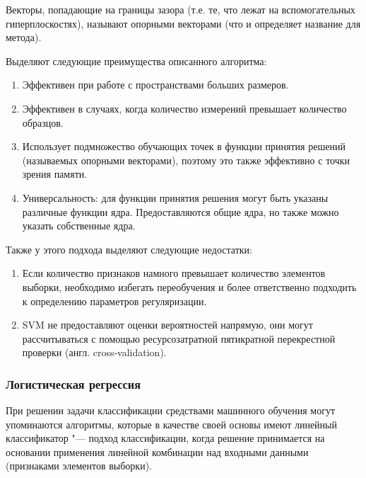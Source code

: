 \documentclass[bachelor, och, coursework]{SCWorks}
\begin{document}
            Векторы, попадающие на границы зазора (т.е. те, что лежат на
            вспомогательных гиперплоскостях), называют опорными векторами (что и
            определяет название для метода).

            Выделяют следующие преимущества описанного алгоритма:

            \begin{enumerate}
                \item Эффективен при работе с пространствами больших размеров.
                \item Эффективен в случаях, когда количество измерений превышает
                количество образцов.
                \item Использует подмножество обучающих точек в функции принятия
                решений (называемых опорными векторами), поэтому это также
                эффективно с точки зрения памяти.
                \item Универсальность: для функции принятия решения могут быть
                указаны различные функции ядра. Предоставляются общие ядра, но
                также можно указать собственные ядра.
            \end{enumerate}
            
            Также у этого подхода выделяют следующие недостатки:

            \begin{enumerate}
                \item Если количество признаков намного превышает количество
                элементов выборки, необходимо избегать переобучения и более
                ответственно подходить к определению параметров регуляризации.
                \item SVM не предоставляют оценки вероятностей напрямую, они
                могут рассчитываться с помощью ресурсозатратной пятикратной
                перекрестной проверки (англ. cross-validation).
            \end{enumerate}

        \subsubsection{Логистическая регрессия}

            При решении задачи классификации средствами машинного обучения могут
            упоминаются алгоритмы, которые в качестве своей основы имеют
            линейный классификатор "--- подход классификации, когда решение
            принимается на основании применения линейной комбинации над входными
            данными (признаками элементов выборки).
\end{document}
